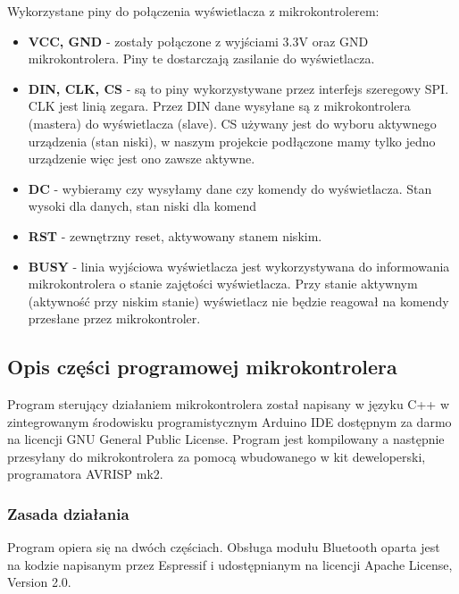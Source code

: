 \documentclass[a4paper,12pt, twoside]{article}
\begin{document}
        Wykorzystane piny do połączenia wyświetlacza z mikrokontrolerem: 
        \begin{itemize}
            \item \textbf{VCC, GND} - zostały połączone z wyjściami 3.3V oraz GND mikrokontrolera. Piny te dostarczają zasilanie do wyświetlacza.
            \item \textbf{DIN, CLK, CS} - są to piny wykorzystywane przez interfejs szeregowy SPI. CLK jest linią zegara. Przez DIN dane wysyłane są z mikrokontrolera (mastera) do wyświetlacza (slave). CS używany jest do wyboru aktywnego urządzenia (stan niski), w naszym projekcie podłączone mamy tylko jedno urządzenie więc jest ono zawsze aktywne.
            \item \textbf{DC} - wybieramy czy wysyłamy dane czy komendy do wyświetlacza. Stan wysoki dla danych, stan niski dla komend
            \item \textbf{RST} - zewnętrzny reset, aktywowany stanem niskim.
            \item \textbf{BUSY}  - linia wyjściowa wyświetlacza jest wykorzystywana do informowania mikrokontrolera o stanie zajętości wyświetlacza. Przy stanie aktywnym (aktywność przy niskim stanie) wyświetlacz nie będzie reagował na komendy przesłane przez mikrokontroler. 
        \end{itemize}
        
        \vspace{.5cm}
        \subsection{Opis części programowej mikrokontrolera}
    	Program sterujący działaniem mikrokontrolera został napisany w języku C++ w zintegrowanym środowisku programistycznym Arduino IDE dostępnym za darmo na licencji GNU General Public License. Program jest kompilowany a następnie przesyłany do mikrokontrolera za pomocą wbudowanego w kit deweloperski, programatora AVRISP mk2.
    	\vspace{.5cm}
    	\subsubsection{Zasada działania}
    	
    	\vspace{.5cm}
        Program opiera się na dwóch częściach. Obsługa modułu Bluetooth oparta jest na kodzie napisanym przez Espressif i udostępnianym na licencji Apache License, Version 2.0. 
        
\end{document}

